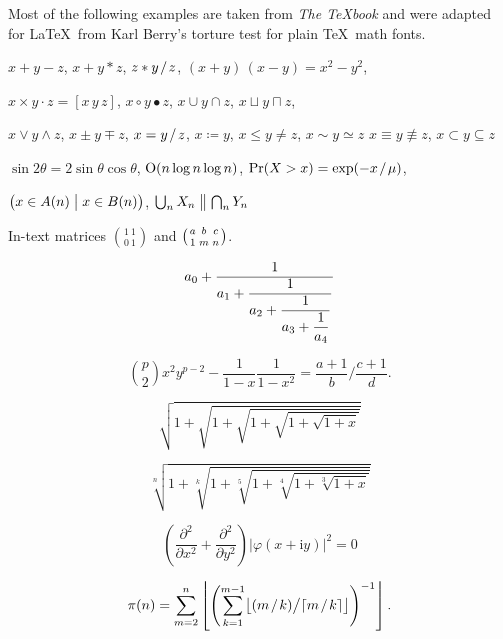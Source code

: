 \documentclass[12pt, a4paper, oneside]{article}
\newcommand{\mathup}[1]{\mathrm{#1}}
\newcommand*{\divslash}{%
	\mathbin{%
		\nonscript\mskip-2mu / \nonscript\mskip-2mu%
	}%
}  %
\theoremstyle{Plain}
\theoremstyle{Definition}
\theoremstyle{Remark}
\begin{document}
\begin{appendix}
\newcommand{\showfamily}{}

Most of the following examples are taken from \textit{The \TeX book} \citep[][see \url{https://ctan.org/pkg/texbook}]{knuth:ct:a} and were adapted for \LaTeX\ from Karl Berry's torture test for plain \TeX\ math fonts.

\noindent $x + y - z$, \quad $x + y * z$, \quad $z * y \divslash z$, \quad
$(x+y)\,(x-y) = x^2 - y^2$,

\noindent $x \times y \cdot z = [x\, y\, z]$, \quad $x\circ y \bullet z$, \quad
$x\cup y \cap z$, \quad $x\sqcup y \sqcap z$, \quad

\noindent $x \vee y \wedge z$, \quad $x\pm y\mp z$, \quad
$x=y \divslash z$, \;\; $x \coloneqq y$, \;\; $x\le y \ne z$, \;\; $x \sim y \simeq z$
$x \equiv y \nequiv z$, \;\; $x\subset y \subseteq z$

\noindent $\sin2\theta=2\sin\theta\cos\theta$, \quad
$\hbox{O}(n\log n\log n)$, \quad
$\Pr(X>x)=\exp(-x \divslash \mu)$,

\noindent $\bigl(x\in A(n)\bigm|x\in B(n)\bigr)$, \quad
$\bigcup_n X_n\bigm\|\bigcap_n Y_n$


\noindent In-text matrices $\binom{1\ 1}{0\ 1}$ and $\bigl(\genfrac{}{}{0pt}{}{a}{1}\genfrac{}{}{0pt}{}{b}{m}\genfrac{}{}{0pt}{}{c}{n}\bigr)$.


$$a_0+\frac1{\displaystyle a_1 +
	{\strut \frac1{\displaystyle a_2 +
			{\strut \frac1{\displaystyle a_3 +
					{\strut \frac1{\displaystyle a_4}}}}}}}$$


$$\binom{p}{2}x^2y^{p-2} - \frac1{1 - x}\frac{1}{1 - x^2}
=
\frac{a+1}{b}\bigg/\frac{c+1}{d}.$$


$$\sqrt{1+\sqrt{1+\sqrt{1+\sqrt{1+\sqrt{1+x}}}}}$$

$$\sqrt[n]{1+\sqrt[k]{1+\sqrt[5]{1+\sqrt[4]{1+\sqrt[3]{1+x}}}}}$$


$$\left(\frac{\partial^2}{\partial x^2} + \frac{\partial^2}{\partial y^2}\right)
\bigl|\varphi(x+\mathup{i}y)\bigr|^2=0$$



$$\pi(n)=\sum_{m=2}^n\left\lfloor\Biggl(\sum_{k=1}^{m-1}\bigl
\lfloor(m \divslash k) \big/ \lceil m \divslash k\rceil\bigr\rfloor\Biggr)^{-1}\right\rfloor.$$


\end{appendix}
\end{document}
